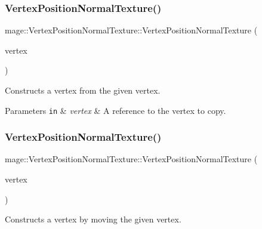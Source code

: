 \subsubsection{\texorpdfstring{Vertex\+Position\+Normal\+Texture()}{VertexPositionNormalTexture()}\hspace{0.1cm}{\footnotesize\ttfamily [3/4]}}
{\footnotesize\ttfamily mage\+::\+Vertex\+Position\+Normal\+Texture\+::\+Vertex\+Position\+Normal\+Texture (\begin{DoxyParamCaption}\item[{const \hyperlink{structmage_1_1_vertex_position_normal_texture}{Vertex\+Position\+Normal\+Texture} \&}]{vertex }\end{DoxyParamCaption})\hspace{0.3cm}{\ttfamily [default]}}

Constructs a vertex from the given vertex.


\begin{DoxyParams}[1]{Parameters}
\mbox{\tt in}  & {\em vertex} & A reference to the vertex to copy. \\
\hline
\end{DoxyParams}
\hypertarget{structmage_1_1_vertex_position_normal_texture_addafeaefa77a932dd88e14bd14e0c7d0}{}\label{structmage_1_1_vertex_position_normal_texture_addafeaefa77a932dd88e14bd14e0c7d0} 
\subsubsection{\texorpdfstring{Vertex\+Position\+Normal\+Texture()}{VertexPositionNormalTexture()}\hspace{0.1cm}{\footnotesize\ttfamily [4/4]}}
{\footnotesize\ttfamily mage\+::\+Vertex\+Position\+Normal\+Texture\+::\+Vertex\+Position\+Normal\+Texture (\begin{DoxyParamCaption}\item[{\hyperlink{structmage_1_1_vertex_position_normal_texture}{Vertex\+Position\+Normal\+Texture} \&\&}]{vertex }\end{DoxyParamCaption})\hspace{0.3cm}{\ttfamily [default]}}

Constructs a vertex by moving the given vertex.


